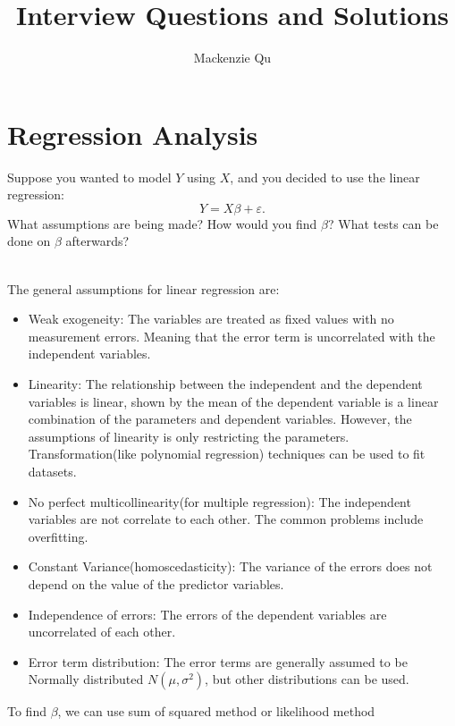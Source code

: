 \documentclass[answers]{exam}
\begin{document}
\title{Interview Questions and Solutions}
\author{Mackenzie Qu}
\maketitle
\thispagestyle{empty}
\section{Regression Analysis}
\begin{questions}
\question Suppose you wanted to model $Y$ using $X$, and you decided to use the linear regression:
\[
  Y = X \beta + \varepsilon
  \text{.}
\]
What assumptions are being made?
How would you find $\beta$?
What tests can be done on $\beta$ afterwards?

\begin{solution}[.2in]
    \\
    The general assumptions for linear regression are:
    \begin{itemize}
        \item Weak exogeneity: The variables are treated as fixed values with no 
        measurement errors. Meaning that the error term is uncorrelated with the independent variables.
        \item Linearity: The relationship between the independent and the dependent
     variables is linear, shown by the mean of the dependent variable is a linear combination
     of the parameters and dependent variables. However, the assumptions of linearity is only restricting the parameters.
     Transformation(like polynomial regression) techniques can be used to fit datasets.
        \item No perfect multicollinearity(for multiple regression): The independent variables are not correlate to each other. The common problems include overfitting.
        \item Constant Variance(homoscedasticity): The variance of the errors does not depend on the value of
        the predictor variables.
        \item Independence of errors: The errors of the dependent variables are uncorrelated of each other.
        \item Error term distribution: The error terms are generally assumed to be Normally distributed $N(\mu, \sigma^2)$, but other distributions can be used. 
    \end{itemize}
    To find $\beta$, we can use sum of squared method or likelihood method


\end{solution}
\end{questions}
\end{document}
